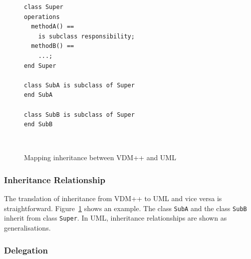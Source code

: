 \documentclass[\pformat,12pt]{article}
\newcommand{\vdmpp}{VDM++}
\begin{document}
\begin{figure}[h]
\vspace{1cm}
\begin{center}
\begin{minipage}[h]{2.5in}
\begin{verbatim}  
class Super  
operations
  methodA() ==  
    is subclass responsibility;  
  methodB() ==  
    ...;  
end Super  
  
class SubA is subclass of Super  
end SubA  
  
class SubB is subclass of Super  
end SubB  
\end{verbatim}
\end{minipage} \ \
\hspace{1cm}
\begin{minipage}[h]{2.5in}
\vspace{1cm}
\end{minipage}
\caption{Mapping inheritance between \vdmpp{} and UML\label{fig:super}}
\end{center}
\end{figure}

\subsubsection*{Inheritance Relationship}
\label{inheritance}

The translation of inheritance from \vdmpp{} to UML and vice versa is
straightforward.  Figure~\ref{fig:super} shows an example. The class
{\tt SubA} and the class {\tt SubB} inherit from class {\tt Super}.
In UML, inheritance relationships are shown as generalisations.
  
\subsubsection*{Delegation}
\end{document}
